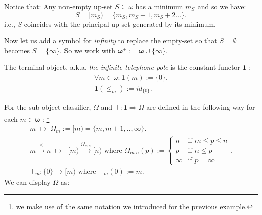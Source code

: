 \begin{ex}
	Notice that: 
	Any non-empty up-set $S\subseteq \omega$ has a minimum $m_S$ and so we have:
	\begin{equation*}
		S = [m_S) = \{m_S, m_S +1, m_S +2...\}.
	\end{equation*}
	 i.e., $S$ coincides with the principal up-set generated by its minimum. \newline
	
	Now let us add a symbol for \emph{infinity} to replace the empty-set so that $S=\emptyset$ becomes $S=\{\infty\}$. \newline
	So we work with $\mathbf{\omega}^+ := \mathbf{\omega} \cup \{\infty\}$.\newline
	
	The terminal object, a.k.a. \emph{the infinite telephone pole}  is the constant functor $\textbf{1}$ :
	\begin{gather*}
		\forall m\in \omega : \textbf{1}(m) := \{0\}. \\
		\textbf{1}(\leq_m) := id_{\{0\}}. 
	\end{gather*}
	 
	
	For the sub-object classifier, $\Omega$ and $\top : \textbf{1} \Rightarrow \Omega$ are defined in the following way for each $m \in \mathbf{\omega}$ : \footnote{we make use of the same notation we introduced for the previous example.}
	\begin{gather*}
		m \;\mapsto\; \Omega_m := [m) = \{m,m+1,..,\infty\}. \\
		m \xrightarrow{\leq} n \;\mapsto\;\; [m)  \xrightarrow{\Omega_{m\;n}} [n) \text{ where } 
		\Omega_{m\;n}(p) :=
		\begin{cases}
			n & \text{if } m \leq p \leq n \\
			p & \text{if } n \leq p \\
			\infty & \text{if } p = \infty
		\end{cases}. \\
		 \top_m: \{0\} \rightarrow  [m) \text{ where } \top_m(0) := m.
	\end{gather*} 
	\newpage
	We can display $\Omega$ as:
	

\end{ex}
